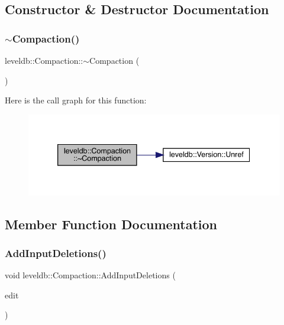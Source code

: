 \subsection{Constructor \& Destructor Documentation}
\mbox{\label{classleveldb_1_1_compaction_ad29d60feea9dd53f54a2bd9301dbd9c4}} 
\subsubsection{\texorpdfstring{$\sim$Compaction()}{~Compaction()}}
{\footnotesize\ttfamily leveldb\+::\+Compaction\+::$\sim$\+Compaction (\begin{DoxyParamCaption}{ }\end{DoxyParamCaption})}

Here is the call graph for this function\+:
\nopagebreak
\begin{figure}[H]
\begin{center}
\leavevmode
\includegraphics[width=339pt]{classleveldb_1_1_compaction_ad29d60feea9dd53f54a2bd9301dbd9c4_cgraph}
\end{center}
\end{figure}


\subsection{Member Function Documentation}
\mbox{\label{classleveldb_1_1_compaction_abb1acdc9b882a7497603b13386e7e1a7}} 
\subsubsection{\texorpdfstring{AddInputDeletions()}{AddInputDeletions()}}
{\footnotesize\ttfamily void leveldb\+::\+Compaction\+::\+Add\+Input\+Deletions (\begin{DoxyParamCaption}\item[{\mbox{\hyperlink{classleveldb_1_1_version_edit}{Version\+Edit}} $\ast$}]{edit }\end{DoxyParamCaption})}

